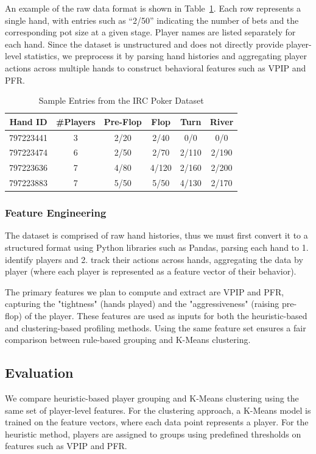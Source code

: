\documentclass[11pt]{extarticle}
\begin{document}
An example of the raw data format is shown in Table~\ref{tab:dataset_sample}. Each row represents a single hand, with entries such as ``2/50'' indicating the number of bets and the corresponding pot size at a given stage. Player names are listed separately for each hand. Since the dataset is unstructured and does not directly provide player-level statistics, we preprocess it by parsing hand histories and aggregating player actions across multiple hands to construct behavioral features such as VPIP and PFR.
\begin{table}[h]
\centering
\small
\begin{tabular}{c c c c c c}
\hline
Hand ID & \#Players & Pre-Flop & Flop & Turn & River \\
\hline
797223441 & 3 & 2/20 & 2/40 & 0/0 & 0/0 \\
797223474 & 6 & 2/50 & 2/70 & 2/110 & 2/190 \\
797223636 & 7 & 4/80 & 4/120 & 2/160 & 2/200 \\
797223883 & 7 & 5/50 & 5/50 & 4/130 & 2/170 \\
\hline
\end{tabular}
\caption{Sample Entries from the IRC Poker Dataset}
\label{tab:dataset_sample}
\end{table}

\subsubsection{Feature Engineering}
The dataset is comprised of raw hand histories, thus we must first convert it to a structured format using Python libraries such as Pandas, parsing each hand to 1. identify players and 2. track their actions across hands, aggregating the data by player (where each player is represented as a feature vector of their behavior).

The primary features we plan to compute and extract are VPIP and PFR, capturing the "tightness" (hands played) and the "aggressiveness" (raising pre-flop) of the player. These features are used as inputs for both the heuristic-based and clustering-based profiling methods. Using the same feature set ensures a fair comparison between rule-based grouping and K-Means clustering.

\subsection{Evaluation}
We compare heuristic-based player grouping and K-Means clustering using the same set of player-level features. For the clustering approach, a K-Means model is trained on the feature vectors, where each data point represents a player. For the heuristic method, players are assigned to groups using predefined thresholds on features such as VPIP and PFR.
\end{document}
